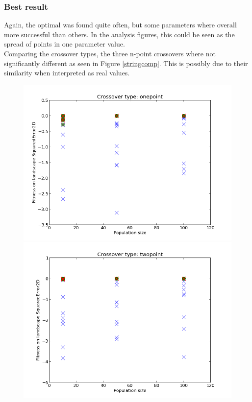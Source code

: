\documentclass{scrartcl}
\begin{document}
\subsubsection{Best result}
Again, the optimal was found quite often, but some parameters where overall more successful than others. In the analysis figures, this could be seen as the spread of points in one parameter value.\\
Comparing the crossover types, the three n-point crossovers where not significantly different as seen in Figure \ref{stringcomp}. This is possibly due to their similarity when interpreted as real values.

\begin{figure}[H]
\centering
\begin{minipage}{.33\textwidth}
  \centering
  \includegraphics[width=.8\linewidth]{img/ex2/onepoint-SquaredError2D-pop.png}
\end{minipage}%
\begin{minipage}{.33\textwidth}
  \centering
  \includegraphics[width=.8\linewidth]{img/ex2/twopoint-SquaredError2D-pop.png}

\end{minipage}
\end{figure}
\end{document}
